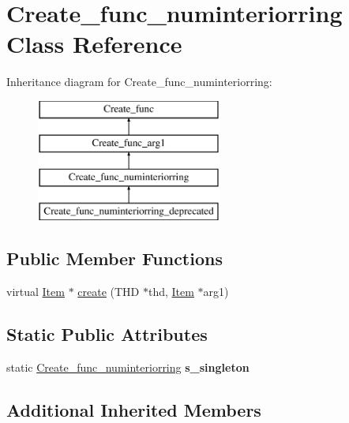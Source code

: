 \hypertarget{classCreate__func__numinteriorring}{}\section{Create\+\_\+func\+\_\+numinteriorring Class Reference}
\label{classCreate__func__numinteriorring}
Inheritance diagram for Create\+\_\+func\+\_\+numinteriorring\+:\begin{figure}[H]
\begin{center}
\leavevmode
\includegraphics[height=4.000000cm]{classCreate__func__numinteriorring}
\end{center}
\end{figure}
\subsection*{Public Member Functions}
\begin{DoxyCompactItemize}
\item 
virtual \mbox{\hyperlink{classItem}{Item}} $\ast$ \mbox{\hyperlink{classCreate__func__numinteriorring_a2a90d2b7363055fd384130f09e5bc5c6}{create}} (T\+HD $\ast$thd, \mbox{\hyperlink{classItem}{Item}} $\ast$arg1)
\end{DoxyCompactItemize}
\subsection*{Static Public Attributes}
\begin{DoxyCompactItemize}
\item 
\mbox{\label{classCreate__func__numinteriorring_a9f8ab7371c2e65edc91e3d959401d9ff}} 
static \mbox{\hyperlink{classCreate__func__numinteriorring}{Create\+\_\+func\+\_\+numinteriorring}} {\bfseries s\+\_\+singleton}
\end{DoxyCompactItemize}
\subsection*{Additional Inherited Members}


